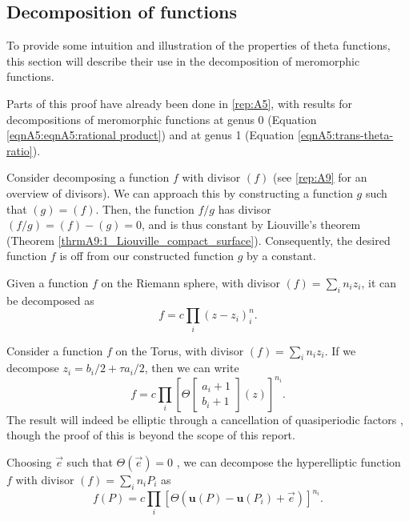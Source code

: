 \subsection{Decomposition of functions}\label{secB12:decomposition}
To provide some intuition and illustration of the properties of theta functions, this section will describe their use in the decomposition of meromorphic functions.

Parts of this proof have already been done in \ref{rep:A5}, with results for decompositions of meromorphic functions at genus 0 (Equation \ref{eqnA5:eqnA5:rational product}) and at genus 1 (Equation \ref{eqnA5:trans-theta-ratio}).

Consider decomposing a function $f$ with divisor $(f)$ (see \ref{rep:A9} for an overview of divisors). We can approach this by constructing a function $g$ such that $(g)=(f)$. Then, the function $f/g$ has divisor $(f/g)=(f)-(g)=0$, and is thus constant by Liouville's theorem (Theorem \ref{thrmA9:1_Liouville_compact_surface}). Consequently, the desired function $f$ is off from our constructed function $g$ by a constant.

\begin{lemma}
    Given a function $f$ on the Riemann sphere, with divisor $(f)=\sum_i n_i z_i$, it can be decomposed as
    \begin{equation}
        f = c \prod_i (z-z_i)^n_i.
    \end{equation}
\end{lemma}

\begin{lemma}
    Consider a function $f$ on the Torus, with divisor $(f) = \sum_i n_i z_i$. If we decompose $z_i = b_i/2 + \tau a_i/2$, then we can write
    \begin{equation}
        f = c \prod_i \left[\Theta\begin{bmatrix}a_i+1 \\ b_i+1\end{bmatrix}(z)\right]^{n_i}.
    \end{equation}
    The result will indeed be elliptic through a cancellation of quasiperiodic factors \cite{Cha22}, though the proof of this is beyond the scope of this report.
\end{lemma}

\begin{lemma}
    Choosing $\vec e$ such that $\Theta(\vec e)=0$ \cite{Ber06}, we can decompose the hyperelliptic function $f$ with divisor $(f) = \sum_i n_i P_i$ as 
    \begin{equation}
        f(P) = c \prod_i \left[\Theta(\mathbf{u}(P) - \mathbf{u}(P_i) + \vec e)\right]^{n_i}.
    \end{equation}
\end{lemma}

